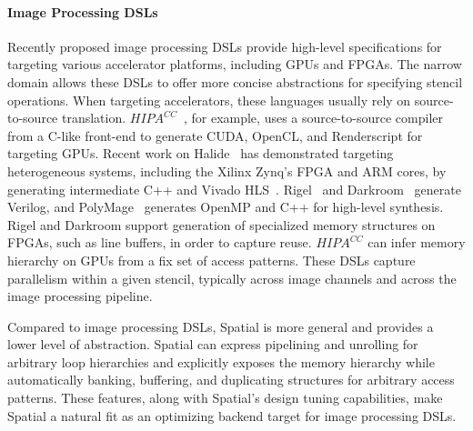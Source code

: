 \paragraph{Image Processing DSLs}
Recently proposed image processing DSLs provide high-level specifications for targeting various
accelerator platforms, including GPUs and FPGAs.%
The narrow domain allows these DSLs to offer more concise abstractions for specifying stencil operations. 
When targeting accelerators, these languages usually rely on source-to-source translation. 
$HIPA^{CC}$~\cite{membarth2016hipa}, for example, uses a
source-to-source compiler from a C-like front-end to generate CUDA, OpenCL, and Renderscript for
targeting GPUs. 
Recent work on Halide~\cite{pldi13halide} has demonstrated targeting heterogeneous systems, including the Xilinx Zynq's FPGA and ARM cores, by generating intermediate C++ and Vivado HLS~\cite{halidefpga}.
Rigel~\cite{hegarty2016rigel} and Darkroom~\cite{hegarty2014darkroom} generate Verilog, 
and PolyMage~\cite{chugh2016dsl} generates OpenMP and C++ for high-level synthesis. 
Rigel and Darkroom support generation of specialized memory structures on FPGAs, such as line buffers, in order to capture
reuse. $HIPA^{CC}$ can infer memory hierarchy on GPUs from a fix set of access patterns. 
These DSLs capture parallelism within a given stencil, typically across image channels 
and across the image processing pipeline.  

Compared to image processing DSLs, Spatial is more general and provides a 
lower level of abstraction. Spatial can express pipelining and unrolling for arbitrary loop hierarchies and explicitly exposes the memory hierarchy while automatically banking, buffering, and duplicating structures for arbitrary
access patterns. These features, along with Spatial's design tuning
capabilities, make Spatial a natural fit as an optimizing backend target for image processing DSLs.


